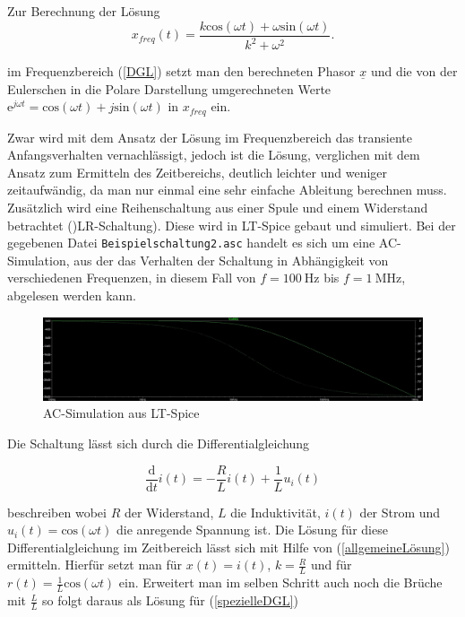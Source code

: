 Zur Berechnung der Lösung 
\begin{equation}
x_{freq} (t) = \frac{k\mathrm{cos}(\omega t) + \omega\mathrm{sin}(\omega t)}{k^2+ \omega^2}.
\label{lsgfreq}
\end{equation}

im Frequenzbereich (\ref{DGL}) setzt man den berechneten Phasor $\underline{x}$ und die von der Eulerschen in die Polare Darstellung umgerechneten Werte $\mathrm{e}^{j\omega t} = \mathrm{cos}(\omega t) + j\mathrm{sin}(\omega t)$ in $x_{freq}$ ein.



Zwar wird mit dem Ansatz der Lösung im Frequenzbereich das transiente Anfangsverhalten vernachlässigt, jedoch ist die Lösung, verglichen mit dem Ansatz zum Ermitteln des Zeitbereichs, deutlich leichter und weniger zeitaufwändig, da man nur einmal eine sehr einfache Ableitung berechnen muss.\\


Zusätzlich wird eine Reihenschaltung aus einer Spule und einem Widerstand betrachtet ()LR-Schaltung). Diese wird in LT-Spice gebaut und simuliert. Bei der gegebenen Datei  \texttt{Beispielschaltung2.asc} handelt es sich um eine AC-Simulation, aus der das Verhalten der Schaltung in Abhängigkeit von verschiedenen Frequenzen, in diesem Fall von $f=\SI{100}{\hertz}$ bis $f=\SI{1}{\mega\hertz}$, abgelesen werden kann. 

\begin{figure}[h]
	\includegraphics[width=\textwidth]{data/spiceplot32}
	\caption{AC-Simulation aus LT-Spice}
	\label{spiceplot}
\end{figure}

Die Schaltung lässt sich durch die Differentialgleichung

\begin{equation}
	\frac{\mathrm{d}}{\mathrm{d}t}i(t) = -\frac{R}{L}i(t) +\frac{1}{L}u_i(t)
	\label{spezielleDGL}
\end{equation}

beschreiben wobei $R$ der Widerstand, $L$ die Induktivität, $i(t)$ der Strom und $u_i(t)=\mathrm{cos}(\omega t)$ die anregende Spannung ist. Die Lösung für diese Differentialgleichung im Zeitbereich lässt sich mit Hilfe von (\ref{allgemeineLösung}) ermitteln. Hierfür setzt man für $x(t) = i(t)$, $k=\frac{R}{L}$ und für $r(t) = \frac{1}{L}\mathrm{cos}(\omega t)$ ein. Erweitert man im selben Schritt auch noch die Brüche mit $\frac{L}{L}$ so folgt daraus als Lösung für (\ref{spezielleDGL})

